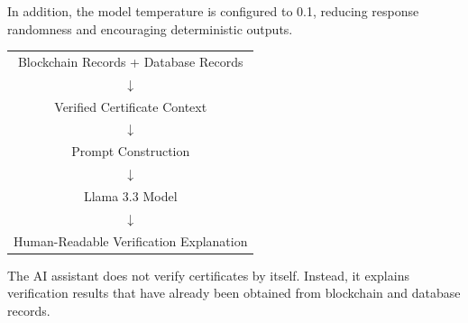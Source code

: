 In addition, the model temperature is configured to 0.1, reducing response randomness and encouraging deterministic outputs.

\begin{center}
    \begin{tabular}{c}
        Blockchain Records + Database Records \\
        $\downarrow$                          \\
        Verified Certificate Context          \\
        $\downarrow$                          \\
        Prompt Construction                   \\
        $\downarrow$                          \\
        Llama 3.3 Model                       \\
        $\downarrow$                          \\
        Human-Readable Verification Explanation
    \end{tabular}
\end{center}

The AI assistant does not verify certificates by itself. Instead, it explains verification results that have already been obtained from blockchain and database records.